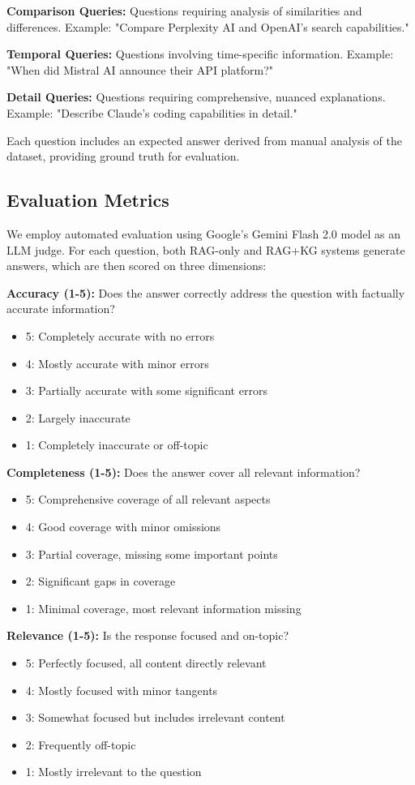\documentclass[11pt,twocolumn]{article}
\begin{document}
\textbf{Comparison Queries:} Questions requiring analysis of similarities and differences. Example: "Compare Perplexity AI and OpenAI's search capabilities."

\textbf{Temporal Queries:} Questions involving time-specific information. Example: "When did Mistral AI announce their API platform?"

\textbf{Detail Queries:} Questions requiring comprehensive, nuanced explanations. Example: "Describe Claude's coding capabilities in detail."

Each question includes an expected answer derived from manual analysis of the dataset, providing ground truth for evaluation.

\subsection{Evaluation Metrics}

We employ automated evaluation using Google's Gemini Flash 2.0 model as an LLM judge. For each question, both RAG-only and RAG+KG systems generate answers, which are then scored on three dimensions:

\textbf{Accuracy (1-5):} Does the answer correctly address the question with factually accurate information?
\begin{itemize}
\item 5: Completely accurate with no errors
\item 4: Mostly accurate with minor errors
\item 3: Partially accurate with some significant errors
\item 2: Largely inaccurate
\item 1: Completely inaccurate or off-topic
\end{itemize}

\textbf{Completeness (1-5):} Does the answer cover all relevant information?
\begin{itemize}
\item 5: Comprehensive coverage of all relevant aspects
\item 4: Good coverage with minor omissions
\item 3: Partial coverage, missing some important points
\item 2: Significant gaps in coverage
\item 1: Minimal coverage, most relevant information missing
\end{itemize}

\textbf{Relevance (1-5):} Is the response focused and on-topic?
\begin{itemize}
\item 5: Perfectly focused, all content directly relevant
\item 4: Mostly focused with minor tangents
\item 3: Somewhat focused but includes irrelevant content
\item 2: Frequently off-topic
\item 1: Mostly irrelevant to the question
\end{itemize}
\end{document}
